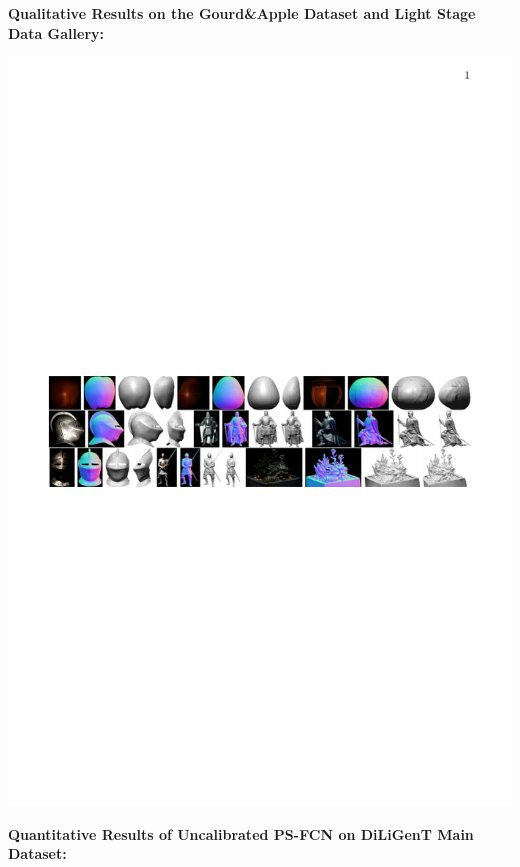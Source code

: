 \documentclass[portrait,a0paper,fontscale=0.292]{baposter}
\begin{document}
\begin{poster}
{    \vspace{0.5em}
    \begin{minipage}[t]{0.6\textwidth}
        \vspace{0.5em}
        \textbf{\color{blue}Qualitative Results on the Gourd\&Apple Dataset and Light Stage Data Gallery:}
        \vspace{-0.8em}
        \begin{center}
            \includegraphics[width=\textwidth]{images/gourd_stage}
        \end{center}
    \end{minipage}
    \begin{minipage}[t]{0.4\textwidth}
        \textbf{\color{blue}Quantitative Results of Uncalibrated PS-FCN on DiLiGenT Main Dataset:} 
        \vspace{-0.5em}

\end{minipage}}
\end{poster}
\end{document}
